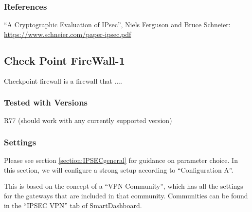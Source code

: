 
\subsubsection{References}
\begin{itemize*}
  \item ``A Cryptographic Evaluation of IPsec'', Niels Ferguson and Bruce
    Schneier: \url{https://www.schneier.com/paper-ipsec.pdf}
\end{itemize*}


\subsection{Check Point FireWall-1}

Checkpoint firewall is a \gls{firewall} that ....

\subsubsection{Tested with Versions}
\begin{itemize*}
  \item R77 (should work with any currently supported version)
\end{itemize*}

\subsubsection{Settings}
Please see section \ref{section:IPSECgeneral} for guidance on
parameter choice. In this section, we will configure a strong setup
according to ``Configuration A''.

This is based on the concept of a ``VPN Community'', which has all the
settings for the gateways that are included in that community.
Communities can be found in the ``IPSEC VPN'' tab of SmartDashboard.

